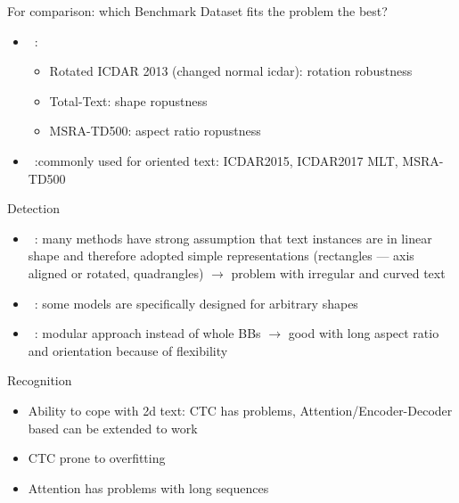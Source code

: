 For comparison: which Benchmark Dataset fits the problem the best?
\begin{itemize}
    \item~\cite{liao_mask_2020}:
        \begin{itemize}
            \item Rotated ICDAR 2013 (changed normal icdar): rotation robustness
            \item Total-Text: shape ropustness
            \item MSRA-TD500: aspect ratio ropustness
        \end{itemize}
    \item~\cite{yang_learning_2021}:commonly used for oriented text: ICDAR2015, ICDAR2017 MLT,
        MSRA-TD500
\end{itemize}

Detection
\begin{itemize}
    \item~\cite{ferrari_textsnake_2018}: many methods have strong assumption that text instances are
        in linear shape and therefore adopted simple representations (rectangles --- axis aligned
        or rotated, quadrangles) $\rightarrow$ problem with irregular and curved text
    \item~\cite{ferrari_textsnake_2018}: some models are specifically designed for arbitrary shapes
    \item~\cite{shi_detecting_2017}: modular approach instead of whole \acp{BB}
        $\rightarrow$ good with long aspect ratio and orientation because of flexibility
\end{itemize}

Recognition
\begin{itemize}
    \item Ability to cope with 2d text:
        CTC has problems,
        Attention/Encoder-Decoder based can be extended to work
    \item CTC prone to overfitting
    \item Attention has problems with long sequences
\end{itemize}

